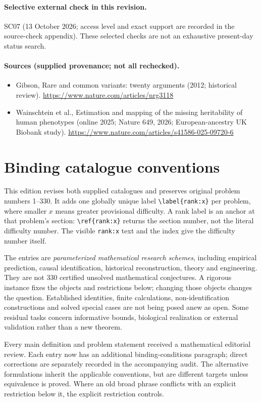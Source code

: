 \documentclass[11pt]{article}
\begin{document}
\paragraph{Selective external check in this revision.} SC07 (13 October 2026; access level and exact support are recorded in the source-check appendix). These selected checks are not an exhaustive present-day status search.

\paragraph{Sources (supplied provenance; not all rechecked).}
\begin{itemize}
\item Gibson, Rare and common variants: twenty arguments (2012; historical review). \url{https://www.nature.com/articles/nrg3118}
\item Wainschtein et al., Estimation and mapping of the missing heritability of human phenotypes (online 2025; Nature 649, 2026; European-ancestry UK Biobank study). \url{https://www.nature.com/articles/s41586-025-09720-6}
\end{itemize}


\section*{Binding catalogue conventions}
This edition revises both supplied catalogues and preserves original problem numbers 1--330. It adds one globally unique label \verb|\label{rank:x}| per problem, where smaller $x$ means greater provisional difficulty. A rank label is an anchor at that problem's section: \verb|\ref{rank:x}| returns the section number, not the literal difficulty number. The visible \texttt{rank:x} text and the index give the difficulty number itself.

The entries are \emph{parameterized mathematical research schemes}, including empirical prediction, causal identification, historical reconstruction, theory and engineering. They are not 330 certified unsolved mathematical conjectures. A rigorous instance fixes the objects and restrictions below; changing those objects changes the question. Established identities, finite calculations, non-identification constructions and solved special cases are not being posed anew as open. Some residual tasks concern informative bounds, biological realization or external validation rather than a new theorem.

Every main definition and problem statement received a mathematical editorial review. Each entry now has an additional binding-conditions paragraph; direct corrections are separately recorded in the accompanying audit. The alternative formulations inherit the applicable conventions, but are different targets unless equivalence is proved. Where an old broad phrase conflicts with an explicit restriction below it, the explicit restriction controls.
\end{document}
